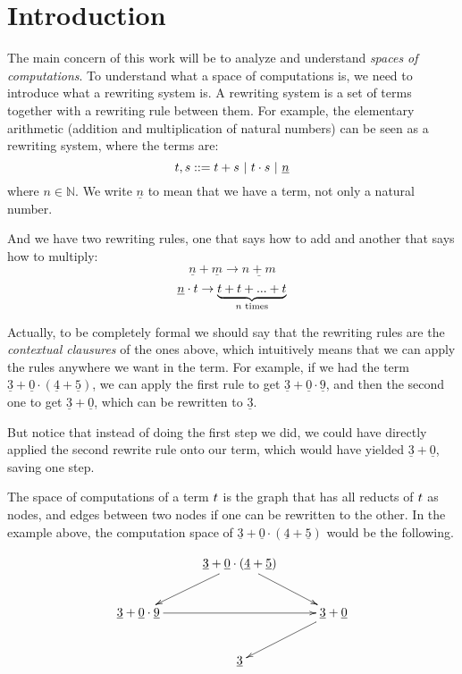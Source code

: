 \chapter{Introduction}

The main concern of this work will be to analyze and understand \emph{spaces of computations}.
To understand what a space of computations is, we need to introduce what a rewriting system is.
A rewriting system is a set of terms together with a rewriting rule between them.
For example, the elementary arithmetic (addition and multiplication of natural numbers)
can be seen as a rewriting system, where the terms are:
\[
  t, s ::= t + s \ |\ t \cdot s \ |\ \underline{n}
\]
\noindent where $n \in \mathbb{N}$. We write $\underline{n}$ to mean that we have a term,
not only a natural number.

And we have two rewriting rules, one that says how to add and another that says how to multiply:
\[
  \underline{n} + \underline{m} \to \underline{n + m}
\]
\[
  \underline{n} \cdot t \to \underbrace{t + t + ... + t}_{n \text{ times}}
\]

Actually, to be completely formal we should say that the rewriting rules are the \emph{contextual clausures}
of the ones above, which intuitively means that we can apply the rules anywhere we want in the term.
For example, if we had the term $\underline{3} + \underline{0} \cdot (\underline{4} + \underline{5})$,
we can apply the first rule to get $\underline{3} + \underline{0} \cdot \underline{9}$,
and then the second one to get $\underline{3} + \underline{0}$, which can be rewritten to $\underline{3}$.

But notice that instead of doing the first step we did, we could have directly applied the second rewrite rule
onto our term, which would have yielded $\underline{3} + \underline{0}$, saving one step.

The space of computations of a term $t$ is the graph that has all reducts of $t$ as nodes,
and edges between two nodes if one can be rewritten to the other.
In the example above, the computation space of $\underline{3} + \underline{0} \cdot (\underline{4} + \underline{5})$
would be the following.

\[
\xymatrix@C=1cm{
  & \underline{3} + \underline{0} \cdot (\underline{4} + \underline{5}) \ar[dr] \ar[dl]& \\
  \underline{3} + \underline{0} \cdot \underline{9} \ar[rr] & & \underline{3} + \underline{0} \ar[dl] \\
  & \underline{3} &
}
\]

